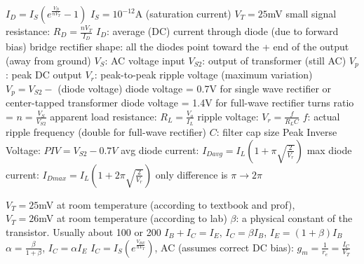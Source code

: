\documentclass[12pt]{article}
\begin{document}
\begin{spacing}{0.8}
\begin{multicols*}{2}
\begin{flushleft}
\begin{outline}[longenum]
  \1 $I_D = I_S \left( e^{\frac{V_D}{n V_T}} - 1 \right)$
    \2 $I_S=10^{-12}$A (saturation current)
    \2 $V_T=25$mV
  \1 small signal resistance: $R_D = \frac{nV_T}{I_D}$
    \2 $I_D$: average (DC) current through diode (due to forward bias)
  \1 bridge rectifier shape: all the diodes point toward the + end of the output (away from ground)
  \1 $V_S$: AC voltage input
  \1 $V_{S2}$: output of transformer (still AC)
  \1 $V_p$: peak DC output
  \2 $V_r$: peak-to-peak ripple voltage (maximum variation)
  \1 $V_p=V_{S2}-$ (diode voltage)
    \2 diode voltage = 0.7V for single wave rectifier or center-tapped transformer
    \2 diode voltage = 1.4V for full-wave rectifier
  \1 turns ratio = $n=\frac{V_S}{V_{S2}}$
  \1 apparent load resistance: $R_L = \frac{V_o}{I_L}$
  \1 ripple voltage: $V_r=\frac{f}{R_L C}$
    \2 $f$: actual ripple frequency (double for full-wave rectifier)
    \2 $C$: filter cap size
  \1 Peak Inverse Voltage: $ PIV = V_{S2}-0.7V$
  \1 avg diode current: $I_{Davg}=I_L \left( 1+\pi\sqrt{\frac{2}{V_r}} \right)$
  \1 max diode current: $I_{Dmax}=I_L \left( 1+2\pi\sqrt{\frac{2}{V_r}} \right)$
    \2 only difference is $\pi \rightarrow 2\pi$

  \1 $V_T = 25$mV at room temperature (according to textbook and prof),
  \\ $V_T = 26$mV at room temperature (according to lab)
  \1 $\beta$: a physical constant of the transistor. Usually about 100 or 200
  \1 
    $I_B + I_C = I_E$, 
    $I_C = \beta I_B$,
    $I_E = (1+\beta) I_B$
  \1
    $\alpha = \frac{\beta}{1+\beta}$,
    $I_C = \alpha I_E$
  \1
    $I_C = I_S ( e^{\frac{V_{BE}}{n V_T}} )$,
  \1 AC (assumes correct DC bias):
    $g_m = \frac{1}{r_e} = \frac{I_C}{V_T}$


\end{outline}
\end{flushleft}
\end{multicols*}
\end{spacing}
\end{document}
